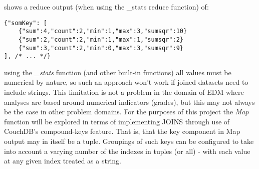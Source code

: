 shows a reduce output (when using the \_stats reduce function) of:

\begin{verbatim}
{"somKey": [
    {"sum":4,"count":2,"min":1,"max":3,"sumsqr":10}
    {"sum":2,"count":2,"min":1,"max":1,"sumsqr":2}
    {"sum":3,"count":2,"min":0,"max":3,"sumsqr":9}
], /* ... */}
\end{verbatim}

using the \textit{\_stats} function (and other built-in functions) all values must be numerical by nature, so such an approach won't work if joined datasets need to include strings. This limitation is not a problem in the domain of EDM where analyses are based around numerical indicators (grades), but this may not always be the case in other problem domains. For the purposes of this project the \textit{Map} function will be explored in terms of implementing JOINS through use of CouchDB's compound-keys feature. That is, that the key component in Map output may in itself be a tuple. Groupings of such keys can be configured to take into account a varying number of the indexes in tuples (or all) - with each value at any given index treated as a string.

